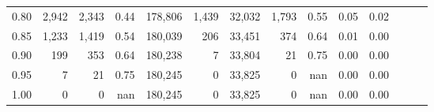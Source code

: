 \begin{tabular}{rrrrrrrrrrrrrr}
0.80 &   2,942 &  2,343 &  0.44 &  178,806 &    1,439 &  32,032 &   1,793 &  0.55 &  0.05 &      0.02 \\
0.85 &   1,233 &  1,419 &  0.54 &  180,039 &      206 &  33,451 &     374 &  0.64 &  0.01 &      0.00 \\
0.90 &     199 &    353 &  0.64 &  180,238 &        7 &  33,804 &      21 &  0.75 &  0.00 &      0.00 \\
0.95 &       7 &     21 &  0.75 &  180,245 &        0 &  33,825 &       0 &   nan &  0.00 &      0.00 \\
1.00 &       0 &      0 &   nan &  180,245 &        0 &  33,825 &       0 &   nan &  0.00 &      0.00 \\
\bottomrule
\end{tabular}
